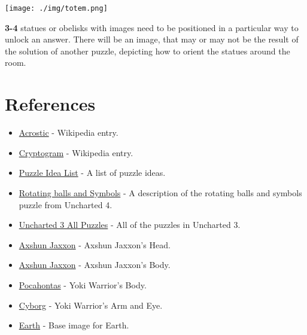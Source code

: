 \documentclass[12pt]{article}
\begin{document}
\begin{center}
\texttt{[image: ./img/totem.png]}
\end{center}

\textbf{3-4} statues or obelisks with images need to be positioned in a particular way to unlock an answer. There will be an image, that may or may not be the result of the solution of another puzzle, depicting how to orient the statues around the room.

\pagebreak

\section{References}
\label{sec:org34e05b0}
\begin{itemize}
\item \href{https://en.wikipedia.org/wiki/Acrostic\_(puzzle)}{Acrostic} - Wikipedia entry.
\item \href{https://en.wikipedia.org/wiki/Cryptogram}{Cryptogram} - Wikipedia entry.
\item \href{http://www.bloodandbones.com/ph12sim/types.htm}{Puzzle Idea List} - A list of puzzle ideas.
\item \href{http://www.accelerated-ideas.com/news/uncharted-4-chapter-1-2-puzzle-solution-rotating-balls.aspx}{Rotating balls and Symbols} - A description of the rotating balls and symbols puzzle from Uncharted 4.
\item \href{http://www.gameshampoo.com/magazine/articles/24/uncharted-3-all-puzzle-solutions.html}{Uncharted 3 All Puzzles} - All of the puzzles in Uncharted 3.
\item \href{http://www.imgrum.org/media/1023891329744782117\_1530550655}{Axshun Jaxxon} - Axshun Jaxxon's Head.
\item \href{https://s-media-cache-ak0.pinimg.com/originals/14/52/4c/14524cd75630c87f04407c2113094535.jpg}{Axshun Jaxxon} - Axshun Jaxxon's Body.
\item \href{http://www.disneystoryoriginspodcast.com/wp-content/uploads/2013/11/pocahontas1.jpg}{Pocahontas} - Yoki Warrior's Body.
\item \href{http://vignette2.wikia.nocookie.net/teentitans/images/2/2a/Cyborg-teen-titans-9542604-1024-768.jpg/revision/latest?cb=20120115083426}{Cyborg} - Yoki Warrior's Arm and Eye.
\item \href{https://cdn2.content.compendiumblog.com/uploads/user/2c9b66c6-7b80-4006-afb9-8204439bca12/60041788-356f-4b71-b236-b0b9c78f8f0d/Image/dc62e65ec149fb09ea2446f1560db77c/71\_\_of\_earths\_surface\_kevin\_m\_\_gill\_\_flikr.jpg}{Earth} - Base image for Earth.

\end{itemize}
\end{document}
